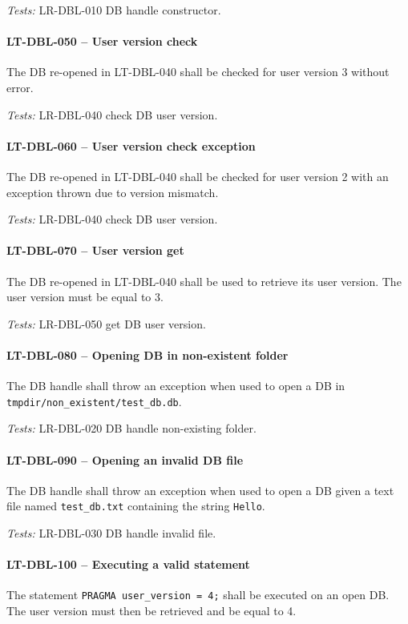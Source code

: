 \textit{Tests: } LR-DBL-010 DB handle constructor.

\paragraph{LT-DBL-050 -- User version check}
The DB re-opened in LT-DBL-040 shall be checked for user version 3
without error.

\textit{Tests: } LR-DBL-040 check DB user version.

\paragraph{LT-DBL-060 -- User version check exception}
The DB re-opened in LT-DBL-040 shall be checked for user version 2
with an exception thrown due to version mismatch.

\textit{Tests: } LR-DBL-040 check DB user version.

\paragraph{LT-DBL-070 -- User version get}
The DB re-opened in LT-DBL-040 shall be used to retrieve its user
version. The user version must be equal to 3.

\textit{Tests: } LR-DBL-050 get DB user version.

\paragraph{LT-DBL-080 -- Opening DB in non-existent folder}
The DB handle shall throw an exception when used to open
a DB in \lstinline{tmpdir/non_existent/test_db.db}.

\textit{Tests: } LR-DBL-020 DB handle non-existing folder.

\paragraph{LT-DBL-090 -- Opening an invalid DB file}
The DB handle shall throw an exception when used to open a DB
given a text file named \lstinline{test_db.txt} containing
the string \lstinline{Hello}.

\textit{Tests: } LR-DBL-030 DB handle invalid file.

\paragraph{LT-DBL-100 -- Executing a valid statement}
The statement \lstinline{PRAGMA user_version = 4;} shall be executed
on an open DB. The user version must then be retrieved and be equal
to 4.

